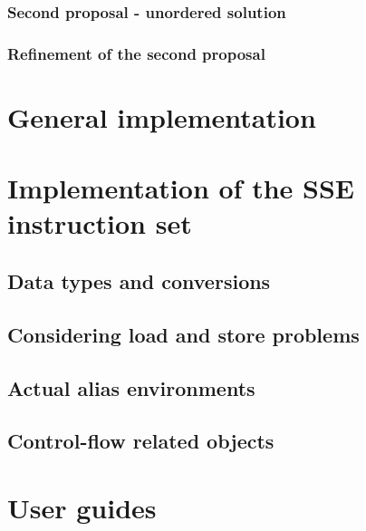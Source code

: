         \subsection{Second proposal - unordered solution} 

        \subsection{Refinement of the second proposal} 

\chapter{General implementation}

    \label{ch:implementation}

 

    


\chapter{Implementation of the SSE instruction set}
    \label{ch:sse}

    \section{Data types and conversions}

    \section{Considering load and store problems} 

    \section{Actual alias environments} 
      

    \section{Control-flow related objects} 


\chapter{User guides}
    \label{ch:faq}

